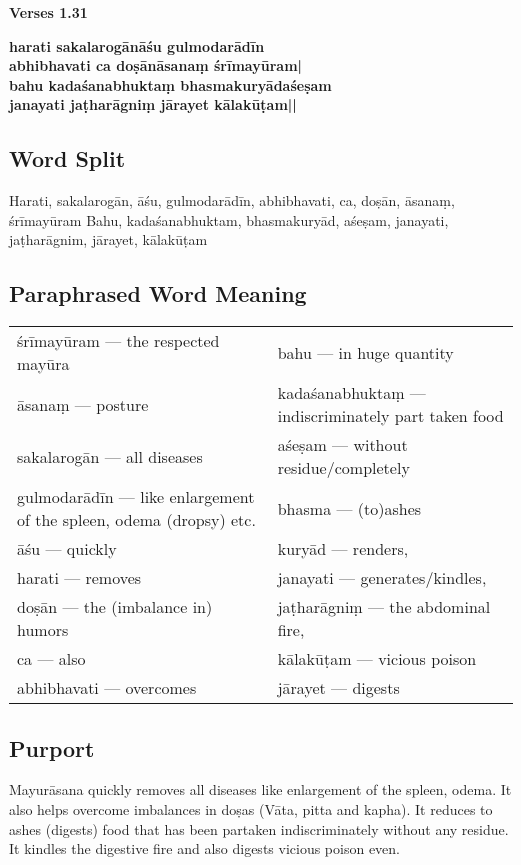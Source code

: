 \noindent 
\textbf{Verses 1.31}

\begin{shloka}
\textbf{harati sakalarogānāśu gulmodarādīn}\\
\textbf{abhibhavati ca doṣānāsanaṃ śrīmayūram|}\\
\textbf{bahu kadaśanabhuktaṃ bhasmakuryādaśeṣam}\\
\textbf{janayati jaṭharāgniṃ jārayet kālakūṭam||}
\end{shloka}

\subsection*{Word Split}

Harati, sakalarogān, āśu, gulmodarādīn, abhibhavati, ca, doṣān, āsanaṃ, śrīmayūram
Bahu, kadaśanabhuktam, bhasmakuryād, aśeṣam, janayati, jaṭharāgnim, jārayet, kālakūṭam

\subsection*{Paraphrased Word Meaning}

\begin{longtable}{>{\noindent\raggedright}p{5cm}>{\noindent\raggedright}p{5cm}}
śrīmayūram --- the respected mayūra  & bahu --- in huge quantity\tabularnewline
āsanaṃ --- posture  & kadaśanabhuktaṃ --- indiscriminately part taken food\tabularnewline
sakalarogān --- all diseases   & aśeṣam --- without residue/completely\tabularnewline
gulmodarādīn --- like enlargement of the spleen, odema (dropsy) etc. &  bhasma --- (to)ashes  \tabularnewline
āśu --- quickly  & kuryād --- renders, \tabularnewline
harati --- removes & janayati --- generates/kindles,\tabularnewline
doṣān --- the (imbalance in) humors  & jaṭharāgniṃ --- the abdominal fire,\tabularnewline
ca --- also & kālakūṭam --- vicious poison \tabularnewline
abhibhavati --- overcomes   & jārayet --- digests
\end{longtable}

\subsection*{Purport}

Mayurāsana quickly removes all diseases like enlargement of the spleen, odema. It also helps overcome imbalances in doṣas (Vāta, pitta and kapha). It reduces to ashes (digests) food that has been partaken indiscriminately without any residue. It kindles the digestive fire and also digests vicious poison even. 

